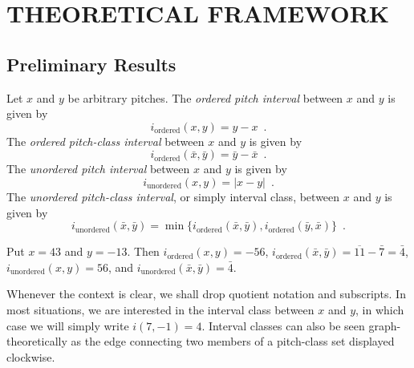 \chapter{THEORETICAL FRAMEWORK}

\section{Preliminary Results}


\begin{definition} Let $x$ and $y$ be arbitrary pitches. The \emph{ordered pitch interval} between $x$ and $y$ is given by
$$
i_\text{ordered}(x, y) = y - x \enspace.
$$
The \emph{ordered pitch-class interval} between $x$ and $y$ is given by
$$
i_\text{ordered}(\bar{x}, \bar{y}) = \bar{y} - \bar{x} \enspace.
$$
The \emph{unordered pitch interval} between $x$ and $y$ is given by
$$
i_\text{unordered}(x, y) = |x - y| \enspace.
$$
The \emph{unordered pitch-class interval}, or simply interval class, between $x$ and $y$ is given by
$$
i_\text{unordered}(\bar{x}, \bar{y}) = \min\{i_\text{ordered}(\bar{x}, \bar{y}), i_\text{ordered}(\bar{y}, \bar{x})\} \enspace.
$$
\end{definition}


\begin{example} Put $x = 43$ and $y = -13$. Then $i_\text{ordered}(x, y) = -56$, $i_\text{ordered}(\bar{x}, \bar{y}) = \overline{11} - \bar{7} = \bar{4}$, $i_\text{unordered}(x, y) = 56$, and $i_\text{unordered}(\bar{x}, \bar{y}) = \bar{4}$.
\end{example}

Whenever the context is clear, we shall drop quotient notation and subscripts. In most situations, we are interested in the interval class between $x$ and $y$, in which case we will simply write $i(7, -1) = 4$. Interval classes can also be seen graph-theoretically as the edge connecting two members of a pitch-class set displayed clockwise.


